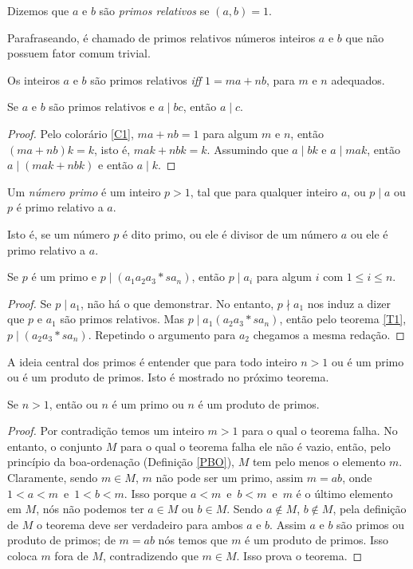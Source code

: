 \begin{definition}
    Dizemos que $a$ e $b$ são \textit{primos relativos} se $(a,b)=1$.
\end{definition}
Parafraseando, é chamado de primos relativos números inteiros $a$ e $b$ que não possuem fator comum trivial.
\begin{corollary}\label{C1}
    Os inteiros $a$ e $b$ são primos relativos \textit{iff} $1 = ma + nb$, para $m$ e $n$ adequados.
\end{corollary}
\begin{theorem}\label{T1}
    Se $a$ e $b$ são primos relativos e $a\mid bc$, então $a\mid c$.
    \begin{proof}
        Pelo colorário \ref{C1}, $ma + nb = 1$ para algum $m$ e $n$, então $(ma +nb)k = k$, isto é, $mak + nbk = k$. Assumindo que $a\mid bk$ e $a\mid mak$, então $a\mid (mak + nbk)$ e então $a\mid k$.
    \end{proof}
\end{theorem}
\begin{definition}
    Um \textit{número primo} é um inteiro $p>1$, tal que para qualquer inteiro $a$, ou $p\mid a$ ou $p$ é primo relativo a $a$.
\end{definition}
Isto é, se um número $p$ é dito primo, ou ele é divisor de um número $a$ ou ele é primo relativo a $a$.
\begin{theorem}\label{T2}
    Se $p$ é um primo e $p\mid (a_{1}a_{2}a_{3}*s a_{n})$, então $p\mid a_{i}$ para algum $i$ com $1\leq i \leq n$.
    \begin{proof}
        Se $p\mid a_{1}$, não há o que demonstrar. No entanto, $p\nmid a_{1}$ nos induz a dizer que $p$ e $a_{1}$ são primos relativos. Mas $p\mid a_{1}(a_{2}a_{3}*s a_{n})$, então pelo teorema \ref{T1}, $p\mid (a_{2}a_{3}*s a_{n})$. Repetindo o argumento para $a_{2}$ chegamos a mesma redação.
    \end{proof}
\end{theorem}
A ideia central dos primos é entender que para todo inteiro $n>1$ ou é um primo ou é um produto de primos. Isto é mostrado no próximo teorema.
\begin{theorem}\label{Prime}
    Se $n>1$, então ou $n$ é um primo ou $n$ é um produto de primos.
    \begin{proof}
        Por contradição temos um inteiro $m>1$ para o qual o teorema falha. No entanto, o conjunto $M$ para o qual o teorema falha ele não é vazio, então, pelo princípio da boa-ordenação (Definição \ref{PBO}), $M$ tem pelo menos o elemento $m$. Claramente, sendo $m \in M$, $m$ não pode ser um primo, assim $m=ab$, onde $1<a<m$\ e\ $1<b<m$. Isso porque $a<m$\ e\ $b<m$\ e\ $m$ é o último elemento em $M$, nós não podemos ter $a \in M$ ou $b \in M$. Sendo $a \notin M$, $b \notin M$, pela definição de $M$ o teorema deve ser verdadeiro para ambos $a$ e $b$. Assim $a$ e $b$ são primos ou produto de primos; de $m=ab$ nós temos que $m$ é um produto de primos. Isso coloca $m$ fora de $M$, contradizendo que $m \in M$. Isso prova o teorema.
    \end{proof}
\end{theorem}
